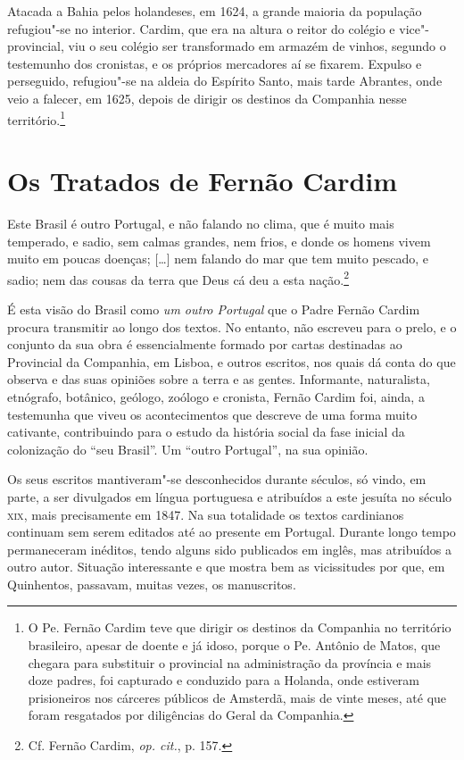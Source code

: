 Atacada a Bahia pelos holandeses, em 1624, a grande maioria da
população refugiou"-se no interior. Cardim, que era na altura o reitor
do colégio e vice"-provincial, viu o seu colégio ser transformado em
armazém de vinhos, segundo o testemunho dos cronistas, e os próprios
mercadores aí se fixarem. Expulso e perseguido, refugiou"-se na aldeia
do Espírito Santo, mais tarde Abrantes, onde veio a falecer, em 1625,
depois de dirigir os destinos da Companhia nesse território.\footnote{ O Pe. 
Fernão Cardim teve que dirigir os destinos da Companhia no
território brasileiro, apesar de doente e já idoso, porque o Pe. Antônio 
de Matos, que chegara para substituir o provincial na
administração da província e mais doze padres, foi capturado e
conduzido para a Holanda, onde estiveram prisioneiros nos cárceres
públicos de Amsterdã, mais de vinte meses, até que foram resgatados
por diligências do Geral da Companhia.} 

\section{Os Tratados de Fernão Cardim}

\begin{hedraquote}
Este Brasil é outro Portugal, e não falando no clima,
que é muito mais temperado, e sadio, sem calmas grandes, nem frios, e
donde os homens vivem muito em poucas doenças; [\ldots] nem falando do mar
que tem muito pescado, e sadio; nem das cousas da terra que Deus cá deu
a esta nação.\footnote{ Cf. Fernão Cardim, \textit{op. cit.}, p. 157.}
\end{hedraquote}

É esta visão do Brasil como \textit{um outro Portugal} que o Padre
Fernão Cardim procura transmitir ao longo dos textos. No entanto, não
escreveu para o prelo, e o conjunto da sua obra é essencialmente formado
por cartas destinadas ao Provincial da Companhia, em Lisboa, e outros
escritos, nos quais dá conta do que observa e das suas opiniões sobre a
terra e as gentes. Informante, naturalista, etnógrafo, botânico,
geólogo, zoólogo e cronista, Fernão Cardim foi, ainda, a testemunha que
viveu os acontecimentos que descreve de uma forma muito cativante,
contribuindo para o estudo da história social da fase inicial da
colonização do ``seu Brasil''. Um ``outro Portugal'', na sua opinião.

Os seus escritos mantiveram"-se desconhecidos durante séculos, só
vindo, em parte, a ser divulgados em língua portuguesa e atribuídos a
este jesuíta no século \textsc{xix}, mais precisamente em 1847. Na sua
totalidade os textos cardinianos continuam sem serem editados até ao
presente em Portugal. Durante longo tempo permaneceram inéditos, tendo
alguns sido publicados em inglês, mas atribuídos a outro autor.
Situação interessante e que mostra bem as vicissitudes por que, em
Quinhentos, passavam, muitas vezes, os manuscritos.


